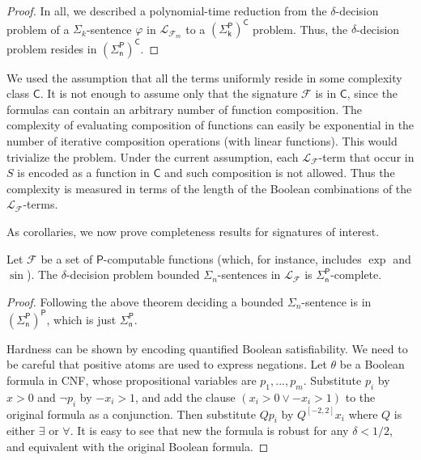 \documentclass[prodmode]{acmsmall} %
\begin{document}
\begin{proof}

In all, we described a polynomial-time reduction from the $\delta$-decision problem of a $\Sigma_k$-sentence $\varphi$ in $\mathcal{L}_{\mathcal{F}_m}$ to a $\mathsf{(\Sigma_k^P)^C}$ problem. Thus, the $\delta$-decision problem resides in $\mathsf{(\Sigma_n^P)^C}$. 
\end{proof}

\begin{remark}
We used the assumption that all the terms uniformly reside in some complexity class $\mathsf{C}$. It is not enough to assume only that the signature $\mathcal{F}$ is in $\mathsf{C}$, since the formulas can contain an arbitrary number of function composition. The complexity of evaluating composition of functions can easily be exponential in the number of iterative composition operations (with linear functions). This would trivialize the problem. Under the current assumption, each $\mathcal{L}_{\mathcal{F}}$-term that occur in $S$ is encoded as a function in $\mathsf{C}$ and such composition is not allowed. Thus the complexity is measured in terms of the length of the Boolean combinations of the $\mathcal{L}_{\mathcal{F}}$-terms.
\end{remark}

As corollaries, we now prove completeness results for signatures of interest. 

\begin{corollary}
Let $\mathcal{F}$ be a set of $\mathsf{P}$-computable functions (which, for instance, includes $\exp$ and $\sin$). The $\delta$-decision problem bounded $\Sigma_n$-sentences in $\mathcal{L}_{\mathcal{F}}$ is $\mathsf{\Sigma_n^P}$-complete. 
\end{corollary}

\begin{proof} Following the above theorem deciding a bounded $\Sigma_n$-sentence is in $\mathsf{(\Sigma_n^P)}^{\mathsf{P}}$, which is just $\mathsf{\Sigma_n^P}$.

Hardness can be shown by encoding quantified Boolean satisfiability. We need to be careful that positive atoms are used to express negations. Let $\theta$ be a Boolean formula in CNF, whose propositional variables are $p_1,...,p_m$. Substitute $p_i$ by $x>0$ and $\neg p_i$ by $-x_i>1$, and add the clause $(x_i>0\vee -x_i>1)$ to the original formula as a conjunction. Then substitute $Q p_i$ by $Q^{[-2,2]}x_i$ where $Q$ is either $\exists$ or $\forall$. It is easy to see that new the formula is robust for any $\delta<1/2$, and equivalent with the original Boolean formula.
\end{proof}
\end{document}
